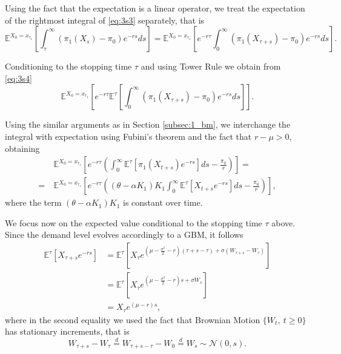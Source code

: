 Using the fact that the expectation is a linear operator, we treat the expectation of the rightmost integral of \eqref{eq:3s3} separately, that is
\begin{equation}
\mathds{E}^{X_0=x_{\tau_1}} \left[  \int_{\tau}^\infty \left( \pi_1(X_s)-\pi_0 \right) e^{-rs}ds  \right] =   \mathds{E}^{X_0=x_{\tau_1}} \left[ e^{-r\tau}  \int_{0}^\infty \left( \pi_1(X_{\tau+s})-\pi_0 \right) e^{-rs}ds  \right].
\label{eq:3s4}
\end{equation}

Conditioning to the stopping time $\tau$ and using Tower Rule we obtain from \eqref{eq:3s4}
\begin{equation}
 \mathds{E}^{X_0=x_{\tau_1}} \left[ e^{-r\tau} \mathds{E}^{\tau}  \left[ \int_{0}^\infty \left( \pi_1(X_{\tau+s})-\pi_0 \right) e^{-rs}ds  \right] \right].
\label{eq:3s5}
\end{equation}

Using the similar arguments as in Section \ref{subsec:1_bm}, we interchange the integral with expectation using Fubini's theorem and the fact that $r-\mu>0$, obtaining
\begin{align}
&\mathds{E}^{X_0=x_{\tau_1}} \left[ e^{-r\tau}  \left( \int_{0}^\infty \mathds{E}^{\tau}  \left[ \pi_1(X_{t+s}) e^{-rs}  \right] ds - \frac{\pi_0}{r} \right) \right]
= \nonumber \\
=\ & \mathds{E}^{X_0=x_{\tau_1}} \left[ e^{-r\tau}  \left(    (\theta-\alpha K_1)K_1  \int_{0}^\infty \mathds{E}^{\tau}  \left[  X_{t+s} e^{-rs}  \right] ds - \frac{\pi_0}{r} \right)  \right],
\label{eq:3s6}
\end{align}
where the term $ (\theta-\alpha K_1)K_1$ is constant over time.



We focus now on the expected value conditional to the stopping time $\tau$ above. 
Since the demand level evolves accordingly to a GBM, it follows 
\begin{align}
\mathds{E}^{\tau}  \left[  X_{\tau+s}e^{-rs}  \right] 
&=\mathds{E}^{\tau}  \left[  X_{\tau} e^{\left( \mu- \frac{\sigma^2}{2}-r \right)   (\tau+s-\tau)+\sigma( W_{\tau+s}-W_\tau)}  \right]  \nonumber \\
&=\mathds{E}^{\tau}  \left[  X_{\tau} e^{\left( \mu- \frac{\sigma^2}{2}-r \right) s+\sigma W_{s}}   \right]  \nonumber \\
&= X_{\tau} e^{\left( \mu-r \right)s},
\label{eq:3s8}
\end{align}
where in the second equality we used the fact that Brownian Motion $\{ W_t, \ t \geq0 \}$ has stationary increments, that is 
$$W_{\tau+s}-W_\tau \overset{d}{=} W_{\tau+s-\tau}-W_0 \overset{d}{=} W_{s} \sim \mathcal{N}(0,s).$$




